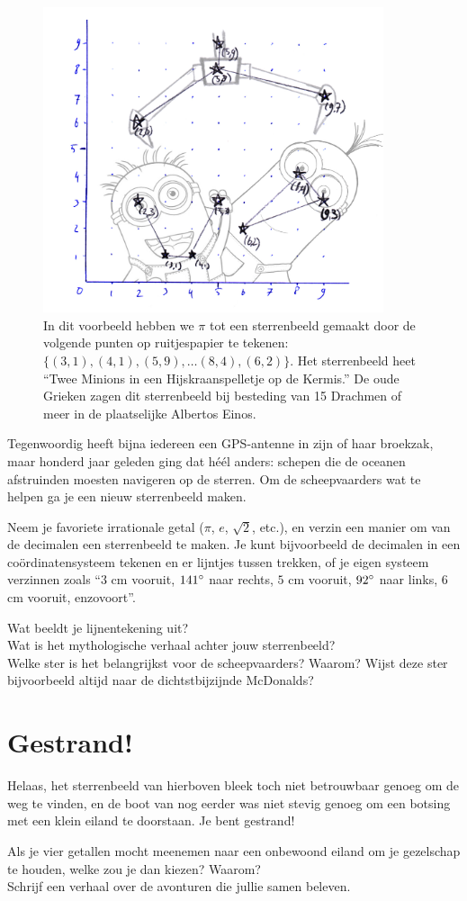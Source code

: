 \documentclass{weekprobleem}
\newcommand{\textgreek}[1]{\begingroup\fontencoding{LGR}\selectfont#1\endgroup}
\begin{document}
\begin{figure}
	\centering
	\includegraphics[width=10cm]{pi}
	\caption{\small{In dit voorbeeld hebben we $\pi$ tot een sterrenbeeld gemaakt door de volgende punten op ruitjespapier te tekenen: $\{(3,1), (4,1), (5,9), \ldots (8,4), (6,2)\}$. Het sterrenbeeld heet ``Twee Minions in een Hijskraanspelletje op de Kermis.'' De oude Grieken zagen dit sterrenbeeld bij besteding van 15 Drachmen of meer in de plaatselijke \textgreek{\>Albertos \<Einos}.}}
\end{figure}
Tegenwoordig heeft bijna iedereen een GPS-antenne in zijn of haar broekzak, maar honderd jaar geleden ging dat héél anders: schepen die de oceanen afstruinden moesten navigeren op de sterren.
Om de scheepvaarders wat te helpen ga je een nieuw sterrenbeeld maken.

Neem je favoriete irrationale getal ($\pi$, $e$, $\sqrt{2}$, etc.), en verzin een manier om van de decimalen een sterrenbeeld te maken.
Je kunt bijvoorbeeld de decimalen in een coördinatensysteem tekenen en er lijntjes tussen trekken, of je eigen systeem verzinnen zoals ``$3$ cm vooruit, $141{\degree}$ naar rechts, $5$ cm vooruit, $92{\degree}$ naar links, $6$ cm vooruit, enzovoort''.

Wat beeldt je lijnentekening uit?\\
Wat is het mythologische verhaal achter jouw sterrenbeeld?\\
Welke ster is het belangrijkst voor de scheepvaarders? Waarom? Wijst deze ster bijvoorbeeld altijd naar de dichtstbijzijnde McDonalds?


\section*{Gestrand!}

Helaas, het sterrenbeeld van hierboven bleek toch niet betrouwbaar genoeg om de weg te vinden, en de boot van nog eerder was niet stevig genoeg om een botsing met een klein eiland te doorstaan. Je bent gestrand!

Als je vier getallen mocht meenemen naar een onbewoond eiland om je gezelschap te houden, welke zou je dan kiezen? Waarom?\\
Schrijf een verhaal over de avonturen die jullie samen beleven.
\end{document}
